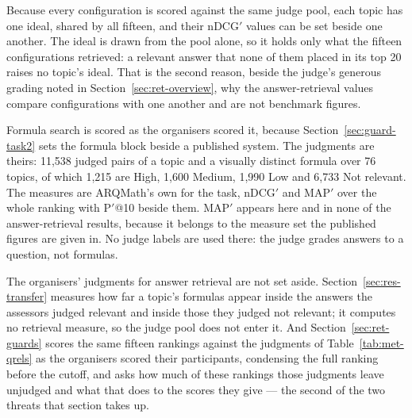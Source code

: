 Because every configuration is scored against the same judge pool, each topic has one
ideal, shared by all fifteen, and their nDCG$'$ values can be set beside one another. The
ideal is drawn from the pool alone, so it holds only what the fifteen configurations
retrieved: a relevant answer that none of them placed in its top 20 raises no topic's
ideal. That is the second reason, beside the judge's generous grading noted in
Section~\ref{sec:ret-overview}, why the answer-retrieval values compare configurations
with one another and are not benchmark figures.

Formula search is scored as the organisers scored it, because
Section~\ref{sec:guard-task2} sets the formula block beside a published system. The judgments
are theirs: 11{,}538 judged pairs of a topic and a visually distinct formula over 76 topics,
of which 1{,}215 are High, 1{,}600 Medium, 1{,}990 Low and 6{,}733 Not relevant. The measures
are ARQMath's own for the task, nDCG$'$ and MAP$'$ over the whole ranking with P$'$@10 beside
them. MAP$'$ appears here and in none of the answer-retrieval results, because it belongs to
the measure set the published figures are given in. No judge labels are used there: the judge
grades answers to a question, not formulas.

The organisers' judgments for answer retrieval are not set aside.
Section~\ref{sec:res-transfer} measures how far a topic's formulas appear inside the
answers the assessors judged relevant and inside those they judged not relevant; it
computes no retrieval measure, so the judge pool does not enter it.
And Section~\ref{sec:ret-guards} scores the same fifteen rankings against the judgments of
Table~\ref{tab:met-qrels} as the organisers scored their participants, condensing the full
ranking before the cutoff, and asks how much of these rankings those judgments leave unjudged
and what that does to the scores they give --- the second of the two threats that section
takes up.


